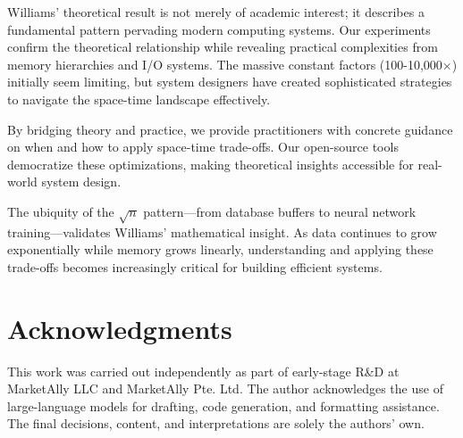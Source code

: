 \documentclass[11pt]{article}
\theoremstyle{definition}
\begin{document}
Williams' theoretical result is not merely of academic interest; it describes a fundamental pattern pervading modern computing systems. Our experiments confirm the theoretical relationship while revealing practical complexities from memory hierarchies and I/O systems. The massive constant factors (100-10,000$\times$) initially seem limiting, but system designers have created sophisticated strategies to navigate the space-time landscape effectively.

By bridging theory and practice, we provide practitioners with concrete guidance on when and how to apply space-time trade-offs. Our open-source tools democratize these optimizations, making theoretical insights accessible for real-world system design.

The ubiquity of the $\sqrt{n}$ pattern---from database buffers to neural network training---validates Williams' mathematical insight. As data continues to grow exponentially while memory grows linearly, understanding and applying these trade-offs becomes increasingly critical for building efficient systems.

\section*{Acknowledgments}
This work was carried out independently as part of early-stage R\&D at MarketAlly LLC and MarketAlly Pte. Ltd. The author acknowledges the use of large-language models for drafting, code generation, and formatting assistance. The final decisions, content, and interpretations are solely the authors' own.

\newpage

\end{document}
